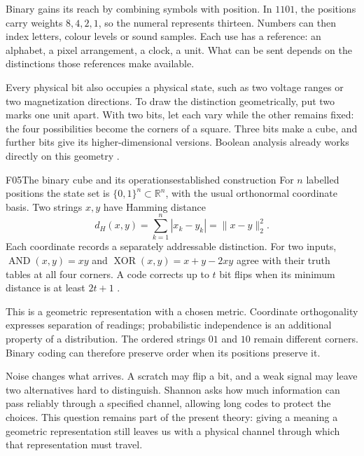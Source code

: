\documentclass[11pt,a4paper]{article}
\newcommand{\R}{\mathbb{R}}
\begin{document}
Binary gains its reach by combining symbols with position. In $1101$, the
positions carry weights $8,4,2,1$, so the numeral represents thirteen. Numbers
can then index letters, colour levels or sound samples. Each use has a
reference: an alphabet, a pixel arrangement, a clock, a unit. What can be sent
depends on the distinctions those references make available.

Every physical bit also occupies a physical state, such as two voltage ranges
or two magnetization directions. To draw the distinction geometrically, put
two marks one unit apart. With two bits, let each vary while the other remains
fixed: the four possibilities become the corners of a square. Three bits make
a cube, and further bits give its higher-dimensional versions. Boolean
analysis already works directly on this geometry \citep{ODonnell2014}.

\begin{formal}{F05}{The binary cube and its operations}{established construction}
For $n$ labelled positions the state set is $\{0,1\}^n\subset\R^n$, with
the usual orthonormal coordinate basis. Two strings $x,y$ have Hamming distance
\begin{equation}
 d_H(x,y)=\sum_{k=1}^n |x_k-y_k|=\|x-y\|_2^2.
\end{equation}
Each coordinate records a separately addressable distinction. For two inputs,
$\operatorname{AND}(x,y)=xy$ and
$\operatorname{XOR}(x,y)=x+y-2xy$ agree with their truth tables at all four
corners. A code corrects up to $t$ bit flips when its minimum distance is at
least $2t+1$ \citep{Hamming1950}.

This is a geometric representation with a chosen metric. Coordinate
orthogonality expresses separation of readings; probabilistic independence is
an additional property of a distribution. The ordered strings $01$ and $10$
remain different corners. Binary coding can therefore preserve order when its
positions preserve it.
\end{formal}

Noise changes what arrives. A scratch may flip a bit, and a weak signal may
leave two alternatives hard to distinguish. Shannon asks how much information
can pass reliably through a specified channel, allowing long codes to protect
the choices. This question remains part of the present theory: giving a
meaning a geometric representation still leaves us with a physical channel
through which that representation must travel.
\end{document}
